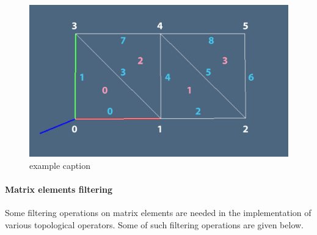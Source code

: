 \documentclass[11pt,oneside]{article}    %
\begin{document}
\begin{figure}[htbp] %
   \centering
   \includegraphics[width=0.6\linewidth]{images/2complex} 
   \caption{example caption}
   \label{fig:2complex}
\end{figure}

\paragraph{Matrix elements filtering}

Some filtering operations on matrix elements are needed in the implementation of various topological operators. Some of such filtering operations are given below.
\end{document}
